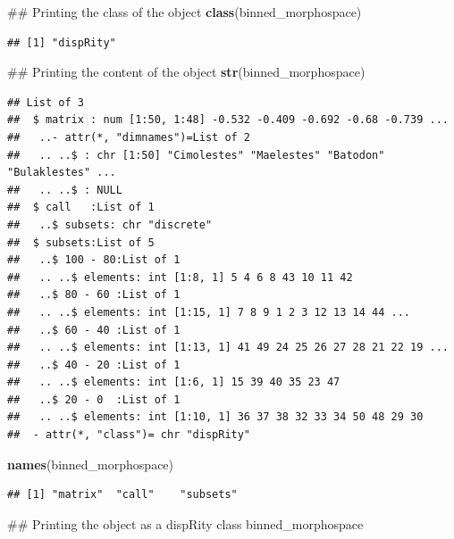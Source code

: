 \documentclass[]{book}
\newenvironment{Shaded}{\begin{snugshade}}{\end{snugshade}}
\newcommand{\KeywordTok}[1]{\textcolor[rgb]{0.13,0.29,0.53}{\textbf{#1}}}
\newcommand{\NormalTok}[1]{#1}
\theoremstyle{definition}
\theoremstyle{definition}
\theoremstyle{definition}
\theoremstyle{remark}
\begin{document}
\begin{Shaded}
\begin{Highlighting}[]
\NormalTok{## Printing the class of the object}
\KeywordTok{class}\NormalTok{(binned_morphospace)}
\end{Highlighting}
\end{Shaded}

\begin{verbatim}
## [1] "dispRity"
\end{verbatim}

\begin{Shaded}
\begin{Highlighting}[]
\NormalTok{## Printing the content of the object}
\KeywordTok{str}\NormalTok{(binned_morphospace)}
\end{Highlighting}
\end{Shaded}

\begin{verbatim}
## List of 3
##  $ matrix : num [1:50, 1:48] -0.532 -0.409 -0.692 -0.68 -0.739 ...
##   ..- attr(*, "dimnames")=List of 2
##   .. ..$ : chr [1:50] "Cimolestes" "Maelestes" "Batodon" "Bulaklestes" ...
##   .. ..$ : NULL
##  $ call   :List of 1
##   ..$ subsets: chr "discrete"
##  $ subsets:List of 5
##   ..$ 100 - 80:List of 1
##   .. ..$ elements: int [1:8, 1] 5 4 6 8 43 10 11 42
##   ..$ 80 - 60 :List of 1
##   .. ..$ elements: int [1:15, 1] 7 8 9 1 2 3 12 13 14 44 ...
##   ..$ 60 - 40 :List of 1
##   .. ..$ elements: int [1:13, 1] 41 49 24 25 26 27 28 21 22 19 ...
##   ..$ 40 - 20 :List of 1
##   .. ..$ elements: int [1:6, 1] 15 39 40 35 23 47
##   ..$ 20 - 0  :List of 1
##   .. ..$ elements: int [1:10, 1] 36 37 38 32 33 34 50 48 29 30
##  - attr(*, "class")= chr "dispRity"
\end{verbatim}

\begin{Shaded}
\begin{Highlighting}[]
\KeywordTok{names}\NormalTok{(binned_morphospace)}
\end{Highlighting}
\end{Shaded}

\begin{verbatim}
## [1] "matrix"  "call"    "subsets"
\end{verbatim}

\begin{Shaded}
\begin{Highlighting}[]
\NormalTok{## Printing the object as a dispRity class}
\NormalTok{binned_morphospace}
\end{Highlighting}
\end{Shaded}
\end{document}
